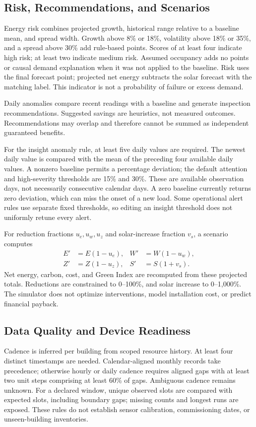 \documentclass[conference]{IEEEtran}
\begin{document}
\subsection{Risk, Recommendations, and Scenarios}
Energy risk combines projected growth, historical range relative to a baseline mean, and spread width. Growth above 8\% or 18\%, volatility above 18\% or 35\%, and a spread above 30\% add rule-based points. Scores of at least four indicate high risk; at least two indicate medium risk. Assumed occupancy adds no points or causal demand explanation when it was not applied to the baseline. Risk uses the final forecast point; projected net energy subtracts the solar forecast with the matching label. This indicator is not a probability of failure or excess demand.

Daily anomalies compare recent readings with a baseline and generate inspection recommendations. Suggested savings are heuristics, not measured outcomes. Recommendations may overlap and therefore cannot be summed as independent guaranteed benefits.

For the insight anomaly rule, at least five daily values are required. The newest daily value is compared with the mean of the preceding four available daily values. A nonzero baseline permits a percentage deviation; the default attention and high-severity thresholds are 15\% and 30\%. These are available observation days, not necessarily consecutive calendar days. A zero baseline currently returns zero deviation, which can miss the onset of a new load. Some operational alert rules use separate fixed thresholds, so editing an insight threshold does not uniformly retune every alert.

For reduction fractions $u_e,u_w,u_z$ and solar-increase fraction $v_s$, a scenario computes
\begin{align}
E'&=E(1-u_e), & W'&=W(1-u_w),\\
Z'&=Z(1-u_z), & S'&=S(1+v_s).
\end{align}
Net energy, carbon, cost, and Green Index are recomputed from these projected totals. Reductions are constrained to 0--100\%, and solar increase to 0--1,000\%. The simulator does not optimize interventions, model installation cost, or predict financial payback.

\subsection{Data Quality and Device Readiness}
Cadence is inferred per building from scoped resource history. At least four distinct timestamps are needed. Calendar-aligned monthly records take precedence; otherwise hourly or daily cadence requires aligned gaps with at least two unit steps comprising at least 60\% of gaps. Ambiguous cadence remains unknown. For a declared window, unique observed slots are compared with expected slots, including boundary gaps; missing counts and longest runs are exposed. These rules do not establish sensor calibration, commissioning dates, or unseen-building inventories.
\end{document}
